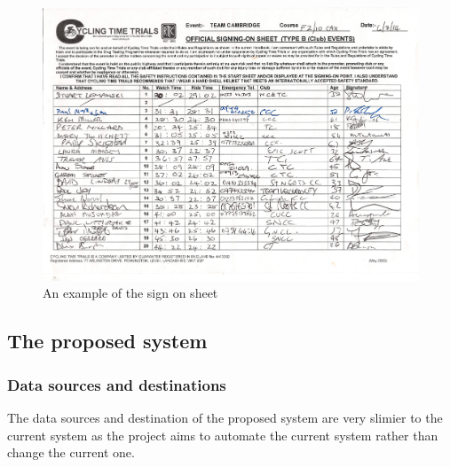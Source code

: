 \begin{figure}[H]
    \includegraphics[width=\textwidth]{./SignOnTimeKeepersSheet.pdf}
    \caption{An example of the sign on sheet} \label{fig:Sign on Sheet}
\end{figure}
\subsection{The proposed system}

\subsubsection{Data sources and destinations}
The data sources and destination of the proposed system are very slimier to the current system as the project aims to automate the current system rather than change the current one.

